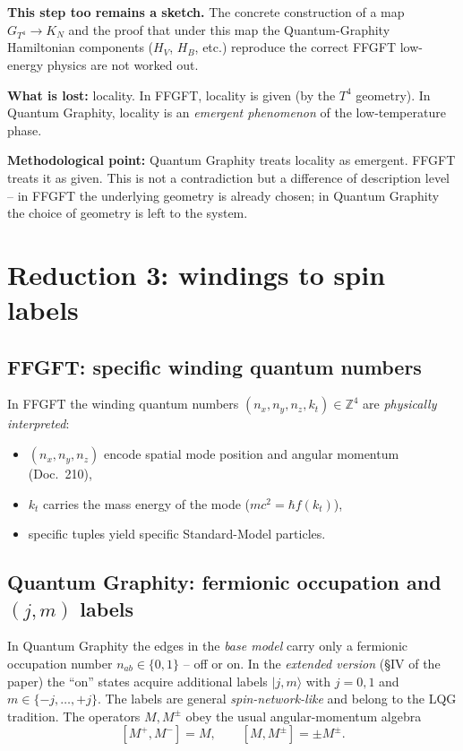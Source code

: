 \textbf{This step too remains a sketch.} The concrete construction
of a map $G_{T^4} \to K_N$ and the proof that under this map the
Quantum-Graphity Hamiltonian components ($H_V$, $H_B$, etc.)
reproduce the correct FFGFT low-energy physics are not worked out.

\textbf{What is lost:} locality. In FFGFT, locality is given (by
the $T^4$ geometry). In Quantum Graphity, locality is an
\emph{emergent phenomenon} of the low-temperature phase.

\textbf{Methodological point:} Quantum Graphity treats locality as
emergent. FFGFT treats it as given. This is not a contradiction but
a difference of description level -- in FFGFT the underlying
geometry is already chosen; in Quantum Graphity the choice of
geometry is left to the system.

\section{Reduction 3: windings to spin labels}

\subsection{FFGFT: specific winding quantum numbers}

In FFGFT the winding quantum numbers
$(n_x, n_y, n_z, k_t) \in \mathbb{Z}^4$ are \emph{physically
interpreted}:
\begin{itemize}[leftmargin=2em,itemsep=2pt,topsep=2pt]
  \item $(n_x, n_y, n_z)$ encode spatial mode position and angular
        momentum (Doc.~210),
  \item $k_t$ carries the mass energy of the mode
        ($m c^2 = \hbar f(k_t)$),
  \item specific tuples yield specific Standard-Model particles.
\end{itemize}

\subsection{\texorpdfstring{Quantum Graphity: fermionic occupation and $(j, m)$ labels}{Quantum Graphity: fermionic occupation and (j,m) labels}}

In Quantum Graphity the edges in the \emph{base model} carry only a
fermionic occupation number $n_{ab} \in \{0, 1\}$ -- off or on. In
the \emph{extended version} (§IV of the paper) the \enquote{on}
states acquire additional labels $|j, m\rangle$ with $j = 0, 1$ and
$m \in \{-j, \ldots, +j\}$. The labels are general
\emph{spin-network-like} and belong to the LQG tradition. The
operators $M, M^\pm$ obey the usual angular-momentum algebra
\[
  [M^+, M^-] = M, \qquad [M, M^\pm] = \pm M^\pm.
\]

